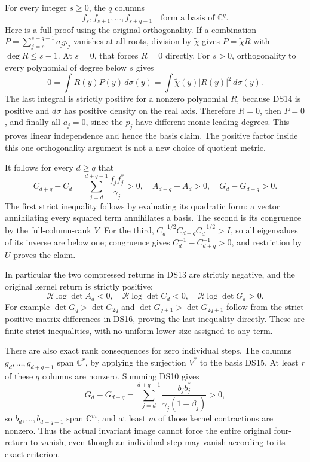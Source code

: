 \documentclass[11pt]{article}
\newcommand{\C}{\mathbb C}
\begin{document}
For every integer \(s\geq0\), the \(q\) columns
\begin{equation}\label{eq:tailbasis}
f_s,f_{s+1},\ldots,f_{s+q-1}
\quad\text{form a basis of }\C^q.
\tag{DS15}
\end{equation}
Here is a full proof using the original orthogonality. If a combination
\(P=\sum_{j=s}^{s+q-1}a_jp_j\) vanishes at all roots, division by
\(\widetilde\chi\) gives \(P=\widetilde\chi R\) with
\(\deg R\leq s-1\). At \(s=0\), that forces \(R=0\) directly.
For \(s>0\), orthogonality to every polynomial of degree below \(s\)
gives
\[
0=\int\overline{R(y)}P(y)\,d\sigma(y)
=\int\widetilde\chi(y)|R(y)|^2\,d\sigma(y).
\]
The last integral is strictly positive for a nonzero polynomial
\(R\), because DS14 is positive and \(d\sigma\) has positive density
on the real axis. Therefore \(R=0\), then \(P=0\), and finally all
\(a_j=0\), since the \(p_j\) have different monic leading degrees.
This proves linear independence and hence the basis claim. The
positive factor inside this one orthogonality argument is not a new
choice of quotient metric.

It follows for every \(d\geq q\) that
\begin{equation}\label{eq:strictblocks}
C_{d+q}-C_d=\sum_{j=d}^{d+q-1}\frac{f_jf_j^*}{\gamma_j}>0,
\quad A_{d+q}-A_d>0,
\quad G_d-G_{d+q}>0.
\tag{DS16}
\end{equation}
The first strict inequality follows by evaluating its quadratic form:
a vector annihilating every squared term annihilates a basis. The second
is its congruence by the full-column-rank \(V\). For the third,
\(C_d^{-1/2}C_{d+q}C_d^{-1/2}>I\), so all eigenvalues of its inverse
are below one; congruence gives \(C_d^{-1}-C_{d+q}^{-1}>0\), and
restriction by \(U\) proves the claim.

In particular the two compressed returns in DS13 are strictly negative,
and the original kernel return is strictly positive:
\begin{equation}\label{eq:strictreturn}
\boxed{\mathcal R\log\det A_d<0,\quad
\mathcal R\log\det C_d<0,\quad
\mathcal R\log\det G_d>0.}
\tag{DS17}
\end{equation}
For example \(\det G_q>\det G_{2q}\) and
\(\det G_{q+1}>\det G_{2q+1}\) follow from the strict positive
matrix differences in DS16, proving the last inequality directly.
These are finite strict inequalities, with no uniform lower size
assigned to any term.

There are also exact rank consequences for zero individual steps.
The columns \(g_d,\ldots,g_{d+q-1}\) span \(\C^r\), by applying
the surjection \(V^*\) to the basis DS15. At least \(r\) of these
\(q\) columns are nonzero. Summing DS10 gives
\[
G_d-G_{d+q}=\sum_{j=d}^{d+q-1}
\frac{b_jb_j^*}{\gamma_j(1+\beta_j)}>0,
\]
so \(b_d,\ldots,b_{d+q-1}\) span \(\C^m\), and at least \(m\)
of those kernel contractions are nonzero. Thus the actual invariant
image cannot force the entire original four-return to vanish, even
though an individual step may vanish according to its exact criterion.
\end{document}
